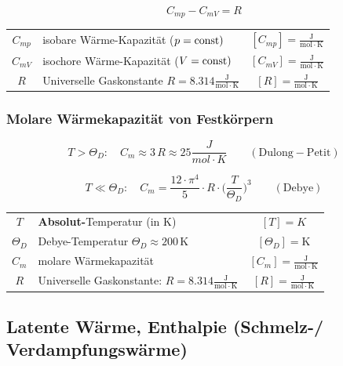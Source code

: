 $$ \boxed{ C_{mp} - C_{mV} = R }$$


\begin{tabular}{c l c}
	\rule{0pt}{8pt}$C_{mp}$ & isobare Wärme-Kapazität ($p = \mathrm{const})$ & $[C_{mp}] = \mathrm{\frac{J}{mol \cdot K}}$ \\
	\rule{0pt}{8pt}$C_{mV}$ & isochore Wärme-Kapazität ($V = \mathrm{const})$ & $[C_{mV}] = \mathrm{\frac{J}{mol \cdot K}}$ \\
	\rule{0pt}{8pt}$R$ & Universelle Gaskonstante $R = 8.314 \mathrm{\frac{J}{mol \cdot K}}$ & $[R] = \mathrm{\frac{J}{mol \cdot K}} $ \\
\end{tabular}




\subsubsection{Molare Wärmekapazität von Festkörpern}


$$ T > \Theta_D: \quad C_m \approx 3 \, R \approx 25 \frac{J}{mol \cdot K}  \qquad \mathrm{(Dulong-Petit)}$$

$$ T \ll \Theta_D: \quad C_m = \frac{12 \cdot \pi^4}{5}  \cdot R \cdot  \Big( \frac{T}{\Theta_D}  \Big)^3 \qquad \mathrm{(Debye)}  $$


\begin{tabular}{c l c}
	$T$ & \textbf{Absolut-}Temperatur (in K) & $[T] = K$ \\
	$\Theta_D$ & Debye-Temperatur $\Theta_D \approx 200 \, \mathrm{K}$ & $[\Theta_D] = \mathrm{K}$ \\
	\rule{0pt}{8pt}$C_m$ & molare Wärmekapazität & $[C_m] = \mathrm{\frac{J}{mol \cdot K}}$ \\
	\rule{0pt}{8pt}$R$ & Universelle Gaskonstante: $R = 8.314 \mathrm{\frac{J}{mol \cdot K}}$ & $[R] = \mathrm{\frac{J}{mol \cdot K}} $ \\
\end{tabular}






\subsection{Latente Wärme, Enthalpie (Schmelz-/ Verdampfungswärme)}



